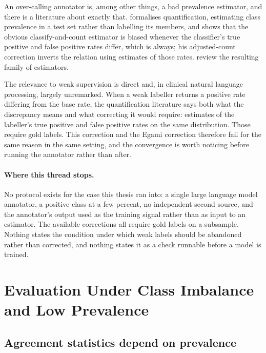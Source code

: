 An over-calling annotator is, among other things, a bad prevalence estimator, and there is a
literature about exactly that. \citet{forman2008quantifying} formalises quantification,
estimating class prevalence in a test set rather than labelling its members, and shows that
the obvious classify-and-count estimator is biased whenever the classifier's true positive
and false positive rates differ, which is always; his adjusted-count correction inverts the
relation using estimates of those rates. \citet{gonzalez2017quantification} review the
resulting family of estimators.

The relevance to weak supervision is direct and, in clinical natural language processing,
largely unremarked. When a weak labeller returns a positive rate differing from the base
rate, the quantification literature says both what the discrepancy means and what correcting
it would require: estimates of the labeller's true positive and false positive rates on the
same distribution. Those require gold labels. This correction and the Egami correction
therefore fail for the same reason in the same setting, and the convergence is worth noticing
before running the annotator rather than after.

\paragraph{Where this thread stops.} No protocol exists for the case this thesis ran into: a
single large language model annotator, a positive class at a few percent, no independent
second source, and the annotator's output used as the training signal rather than as input to
an estimator. The available corrections all require gold labels on a subsample. Nothing
states the condition under which weak labels should be abandoned rather than corrected, and
nothing states it as a check runnable before a model is trained.

\section{Evaluation Under Class Imbalance and Low Prevalence}
\label{sec:lit-metrics}

\subsection{Agreement statistics depend on prevalence}

